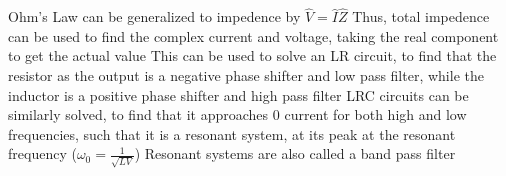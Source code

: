 \documentclass[11 pt, twoside]{article}
\newenvironment{outline*}
{
	\begin{outline}[enumerate]
	}
	{\end{outline}
}
\begin{document}
\begin{outline*}
		\3 Ohm's Law can be generalized to impedence by $\hat{V} = \hat{I}\hat{Z}$
	\2 Thus, total impedence can be used to find the complex current and voltage, taking the real component to get the actual value
	\2 This can be used to solve an LR circuit, to find that the resistor as the output is a negative phase shifter and low pass filter, while the inductor is a positive phase shifter and high pass filter
		\3 LRC circuits can be similarly solved, to find that it approaches 0 current for both high and low frequencies, such that it is a resonant system, at its peak at the resonant frequency ($\omega_0 = \frac{1}{\sqrt{LV}}$)	
			\4 Resonant systems are also called a band pass filter
\end{outline*}
\end{document}
